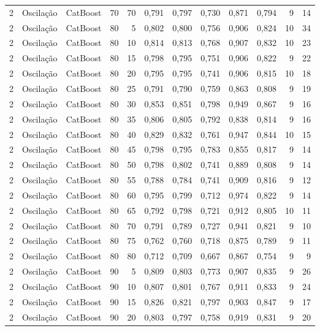 \begin{longtable}{@{}rllrrrrrrrrr@{}}
2 & Oscilação & CatBoost & 70 & 70 & 0,791 & 0,797 & 0,730 & 0,871 & 0,794 & 9 & 14 \\
2 & Oscilação & CatBoost & 80 & 5 & 0,802 & 0,800 & 0,756 & 0,906 & 0,824 & 10 & 34 \\
2 & Oscilação & CatBoost & 80 & 10 & 0,814 & 0,813 & 0,768 & 0,907 & 0,832 & 10 & 23 \\
2 & Oscilação & CatBoost & 80 & 15 & 0,798 & 0,795 & 0,751 & 0,906 & 0,822 & 9 & 22 \\
2 & Oscilação & CatBoost & 80 & 20 & 0,795 & 0,795 & 0,741 & 0,906 & 0,815 & 10 & 18 \\
2 & Oscilação & CatBoost & 80 & 25 & 0,791 & 0,790 & 0,759 & 0,863 & 0,808 & 9 & 19 \\
2 & Oscilação & CatBoost & 80 & 30 & 0,853 & 0,851 & 0,798 & 0,949 & 0,867 & 9 & 16 \\
2 & Oscilação & CatBoost & 80 & 35 & 0,806 & 0,805 & 0,792 & 0,838 & 0,814 & 9 & 16 \\
2 & Oscilação & CatBoost & 80 & 40 & 0,829 & 0,832 & 0,761 & 0,947 & 0,844 & 10 & 15 \\
2 & Oscilação & CatBoost & 80 & 45 & 0,798 & 0,795 & 0,783 & 0,855 & 0,817 & 9 & 14 \\
2 & Oscilação & CatBoost & 80 & 50 & 0,798 & 0,802 & 0,741 & 0,889 & 0,808 & 9 & 14 \\
2 & Oscilação & CatBoost & 80 & 55 & 0,788 & 0,784 & 0,741 & 0,909 & 0,816 & 9 & 12 \\
2 & Oscilação & CatBoost & 80 & 60 & 0,795 & 0,799 & 0,712 & 0,974 & 0,822 & 9 & 14 \\
2 & Oscilação & CatBoost & 80 & 65 & 0,792 & 0,798 & 0,721 & 0,912 & 0,805 & 10 & 11 \\
2 & Oscilação & CatBoost & 80 & 70 & 0,791 & 0,789 & 0,727 & 0,941 & 0,821 & 9 & 10 \\
2 & Oscilação & CatBoost & 80 & 75 & 0,762 & 0,760 & 0,718 & 0,875 & 0,789 & 9 & 11 \\
2 & Oscilação & CatBoost & 80 & 80 & 0,712 & 0,709 & 0,667 & 0,867 & 0,754 & 9 & 9 \\
2 & Oscilação & CatBoost & 90 & 5 & 0,809 & 0,803 & 0,773 & 0,907 & 0,835 & 9 & 26 \\
2 & Oscilação & CatBoost & 90 & 10 & 0,807 & 0,801 & 0,767 & 0,911 & 0,833 & 9 & 24 \\
2 & Oscilação & CatBoost & 90 & 15 & 0,826 & 0,821 & 0,797 & 0,903 & 0,847 & 9 & 17 \\
2 & Oscilação & CatBoost & 90 & 20 & 0,803 & 0,797 & 0,758 & 0,919 & 0,831 & 9 & 20 \\

\end{longtable}
